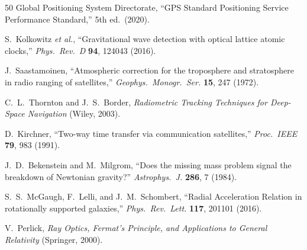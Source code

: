 \documentclass[aps,prd,twocolumn,superscriptaddress,nofootinbib,longbibliography]{revtex4-2}
\begin{document}
\begin{thebibliography}{50}
Global Positioning System Directorate,
``GPS Standard Positioning Service Performance Standard,'' 5th ed.\ (2020).

S.~Kolkowitz \textit{et al.},
``Gravitational wave detection with optical lattice atomic clocks,''
\textit{Phys.\ Rev.\ D} \textbf{94}, 124043 (2016).

J.~Saastamoinen,
``Atmospheric correction for the troposphere and stratosphere in radio
ranging of satellites,''
\textit{Geophys.\ Monogr.\ Ser.} \textbf{15}, 247 (1972).

C.~L.~Thornton and J.~S.~Border,
\textit{Radiometric Tracking Techniques for Deep-Space Navigation}
(Wiley, 2003).

D.~Kirchner,
``Two-way time transfer via communication satellites,''
\textit{Proc.\ IEEE} \textbf{79}, 983 (1991).

J.~D.~Bekenstein and M.~Milgrom,
``Does the missing mass problem signal the breakdown of Newtonian gravity?''
\textit{Astrophys.\ J.} \textbf{286}, 7 (1984).

S.~S.~McGaugh, F.~Lelli, and J.~M.~Schombert,
``Radial Acceleration Relation in rotationally supported galaxies,''
\textit{Phys.\ Rev.\ Lett.} \textbf{117}, 201101 (2016).

V.~Perlick,
\textit{Ray Optics, Fermat's Principle, and Applications to General
Relativity}
(Springer, 2000).

\end{thebibliography}
\end{document}
